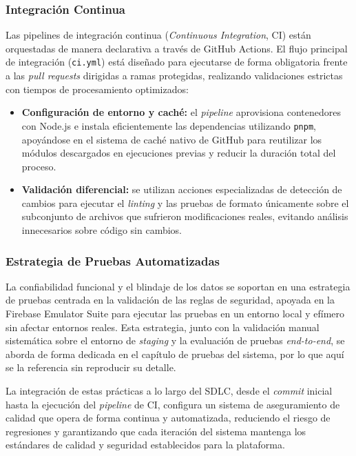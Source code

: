 \subsubsection{Integración Continua}

Las pipelines de integración continua (\textit{Continuous Integration}, CI) están orquestadas de manera declarativa a través de GitHub Actions. El flujo principal de integración (\texttt{ci.yml}) está diseñado para ejecutarse de forma obligatoria frente a las \textit{pull requests} dirigidas a ramas protegidas, realizando validaciones estrictas con tiempos de procesamiento optimizados:

\begin{itemize}
  \item \textbf{Configuración de entorno y caché:} el \textit{pipeline} aprovisiona contenedores con Node.js e instala eficientemente las dependencias utilizando \texttt{pnpm}, apoyándose en el sistema de caché nativo de GitHub para reutilizar los módulos descargados en ejecuciones previas y reducir la duración total del proceso.

  \item \textbf{Validación diferencial:} se utilizan acciones especializadas de detección de cambios para ejecutar el \textit{linting} y las pruebas de formato únicamente sobre el subconjunto de archivos que sufrieron modificaciones reales, evitando análisis innecesarios sobre código sin cambios.
\end{itemize}

\subsubsection{Estrategia de Pruebas Automatizadas}

La confiabilidad funcional y el blindaje de los datos se soportan en una estrategia de pruebas centrada en la validación de las reglas de seguridad, apoyada en la Firebase Emulator Suite para ejecutar las pruebas en un entorno local y efímero sin afectar entornos reales. Esta estrategia, junto con la validación manual sistemática sobre el entorno de \textit{staging} y la evaluación de pruebas \textit{end-to-end}, se aborda de forma dedicada en el capítulo de pruebas del sistema, por lo que aquí se la referencia sin reproducir su detalle.

La integración de estas prácticas a lo largo del SDLC, desde el \textit{commit} inicial hasta la ejecución del \textit{pipeline} de CI, configura un sistema de aseguramiento de calidad que opera de forma continua y automatizada, reduciendo el riesgo de regresiones y garantizando que cada iteración del sistema mantenga los estándares de calidad y seguridad establecidos para la plataforma.
